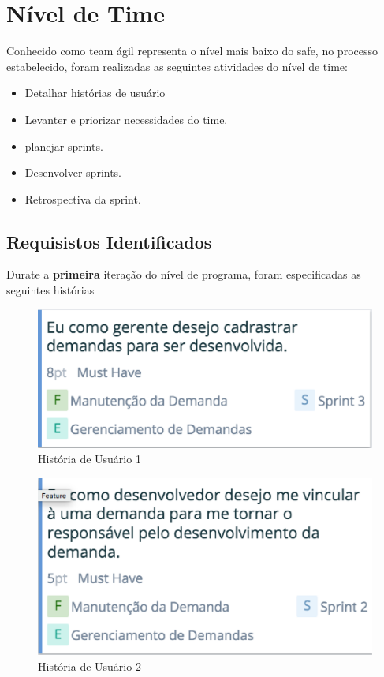 \section{Nível de Time}

Conhecido como team ágil representa o nível mais baixo do safe, no processo estabelecido,
foram realizadas as seguintes atividades do nível de time:

\begin{itemize}
  \item Detalhar histórias de usuário
  \item Levanter e priorizar necessidades do time.
  \item planejar sprints.
  \item Desenvolver sprints.
  \item Retrospectiva da sprint.
\end{itemize}

\subsection{Requisistos Identificados}

Durate a \textbf{primeira} iteração do nível de programa, foram especificadas as seguintes histórias

\begin{figure}[H]
    \centering
	\includegraphics[keepaspectratio=true,scale=0.5]{figuras/time1.eps}
    \caption{História de Usuário 1}
    \label{fig:roadmap}
\end{figure}

\begin{figure}[H]
    \centering
	\includegraphics[keepaspectratio=true,scale=0.5]{figuras/time2.eps}
    \caption{História de Usuário 2}
    \label{fig:roadmap}
\end{figure}

